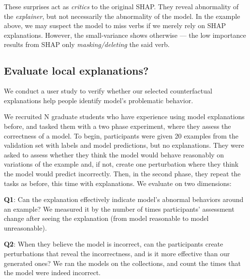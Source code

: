 These surprises act as \emph{critics} to the original SHAP.
They reveal abnormality of the \emph{explainer}, but not necessarily the abnormality of the model.
In the example above, we may suspect the model to miss verbs if we merely rely on SHAP explanations. However, the small-variance shows otherwise --- the low importance results from SHAP only \emph{masking/deleting} the said verb.


\subsection{Evaluate local explanations?}
We conduct a user study to verify whether our selected counterfactual explanations help people identify model's problematic behavior.

We recruited N graduate students who have experience using model explanations before, and tasked them with a two phase experiment, where they assess the correctness of a \qqp model.
To begin, participants were given 20 \qqp examples from the validation set with labels and model predictions, but no explanations.
They were asked to assess whether they think the model would behave reasonably on variations of the example and, if not, create one perturbation where they think the model would predict incorrectly.
Then, in the second phase, they repeat the tasks as before, this time with explanations.
We evaluate on two dimensions:

\textbf{Q1}: 
Can the explanation effectively indicate model's abnormal behaviors around an example? 
We measured it by the number of times participants' assessment change after seeing the explanation (\eg from model reasonable to model unreasonable).

\textbf{Q2}: 
When they believe the model is incorrect, can the participants create perturbations that reveal the incorrectness, and is it more effective than our generated ones?
We ran the models on the collections, and count the times that the model were indeed incorrect.



